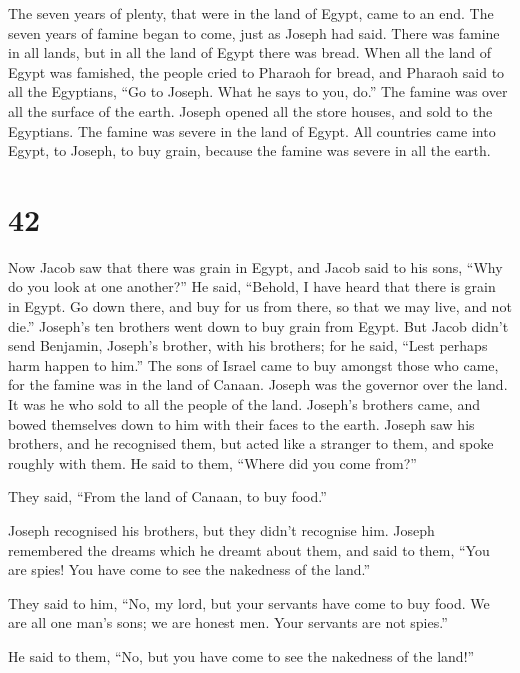  The seven years of plenty, that were in the land of Egypt,
came to an end.  The seven years of famine began to come,
just as Joseph had said. There was famine in all lands, but in all the
land of Egypt there was bread.  When all the land of Egypt
was famished, the people cried to Pharaoh for bread, and Pharaoh said to
all the Egyptians, ``Go to Joseph. What he says to you, do.''
 The famine was over all the surface of the earth. Joseph
opened all the store houses, and sold to the Egyptians. The famine was
severe in the land of Egypt.  All countries came into
Egypt, to Joseph, to buy grain, because the famine was severe in all the
earth.

\hypertarget{section-41}{%
\section{42}\label{section-41}}

 Now Jacob saw that there was grain in Egypt, and Jacob said
to his sons, ``Why do you look at one another?''  He said,
``Behold, I have heard that there is grain in Egypt. Go down there, and
buy for us from there, so that we may live, and not die.'' 
Joseph's ten brothers went down to buy grain from Egypt. 
But Jacob didn't send Benjamin, Joseph's brother, with his brothers; for
he said, ``Lest perhaps harm happen to him.''  The sons of
Israel came to buy amongst those who came, for the famine was in the
land of Canaan.  Joseph was the governor over the land. It
was he who sold to all the people of the land. Joseph's brothers came,
and bowed themselves down to him with their faces to the earth.
 Joseph saw his brothers, and he recognised them, but acted
like a stranger to them, and spoke roughly with them. He said to them,
``Where did you come from?''

They said, ``From the land of Canaan, to buy food.''

 Joseph recognised his brothers, but they didn't recognise
him.  Joseph remembered the dreams which he dreamt about
them, and said to them, ``You are spies! You have come to see the
nakedness of the land.''

 They said to him, ``No, my lord, but your servants have
come to buy food.  We are all one man's sons; we are honest
men. Your servants are not spies.''

 He said to them, ``No, but you have come to see the
nakedness of the land!''

